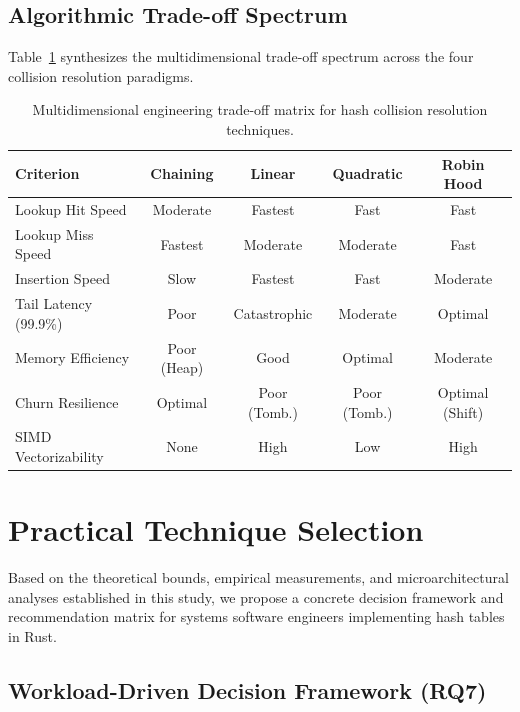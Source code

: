 \documentclass[conference]{IEEEtran}
\begin{document}
\subsection{Algorithmic Trade-off Spectrum}

Table~\ref{tbl:tradeoff_spectrum} synthesizes the multidimensional trade-off spectrum across the four collision resolution paradigms.

\begin{table}[t]
\centering
\caption{Multidimensional engineering trade-off matrix for hash collision resolution techniques.}
\label{tbl:tradeoff_spectrum}
\begin{tabular}{lcccc}
\toprule
\textbf{Criterion} & \textbf{Chaining} & \textbf{Linear} & \textbf{Quadratic} & \textbf{Robin Hood} \\
\midrule
Lookup Hit Speed & Moderate & Fastest & Fast & Fast \\
Lookup Miss Speed & Fastest & Moderate & Moderate & Fast \\
Insertion Speed & Slow & Fastest & Fast & Moderate \\
Tail Latency (99.9\%) & Poor & Catastrophic & Moderate & Optimal \\
Memory Efficiency & Poor (Heap) & Good & Optimal & Moderate \\
Churn Resilience & Optimal & Poor (Tomb.) & Poor (Tomb.) & Optimal (Shift) \\
SIMD Vectorizability & None & High & Low & High \\
\bottomrule
\end{tabular}
\end{table}

\section{Practical Technique Selection}

Based on the theoretical bounds, empirical measurements, and microarchitectural analyses established in this study, we propose a concrete decision framework and recommendation matrix for systems software engineers implementing hash tables in Rust.

\subsection{Workload-Driven Decision Framework (RQ7)}
\end{document}
